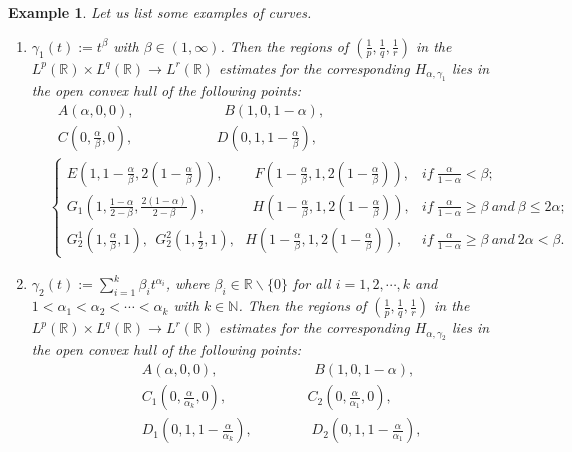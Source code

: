 \documentclass[11pt, twoside, leqno]{article}
\newtheorem{example}[theorem]{Example}
\theoremstyle{definition}
\numberwithin{equation}{section}
\begin{document}
\begin{example}
Let us list some examples of curves.
\begin{enumerate}
\item[\rm(1)] $\gamma_1(t):=t^\beta$ with $\beta\in(1,\infty)$. Then the regions of $(\frac{1}{p}, \frac{1}{q}, \frac{1}{r})$ in the $L^p(\mathbb{R})\times L^q(\mathbb{R}) \rightarrow L^r(\mathbb{R})$ estimates for the corresponding $H_{\alpha,\gamma_1}$ lies in the open convex hull of the following points:
\begin{align*}
&~~~A\left(\alpha,0,0\right),~~~~~~~~~~~~~~~~~~~~~~~~~~~~~B\left(1,0,1-\alpha\right),\\
&~~~C\left(0,\frac{\alpha}{\beta},0\right),~~~~~~~~~~~~~~~~~~~~~~~~~~~D\left(0,1,1-\frac{\alpha}{\beta}\right),\\
&\begin{cases}
 E\left(1, 1-\frac{\alpha}{\beta}, 2(1-\frac{\alpha}{\beta})\right),~~~~~~~~~~F\left(1-\frac{\alpha}{\beta}, 1, 2(1-\frac{\alpha}{\beta})\right),&  if~ \frac{\alpha}{1-\alpha}<\beta;\\
 G_1\left(1, \frac{1-\alpha}{2-\beta}, \frac{2(1-\alpha)}{2-\beta}\right),~~~~~~~~~~~~~~~H\left(1-\frac{\alpha}{\beta}, 1, 2(1-\frac{\alpha}{\beta})\right),& if~ \frac{\alpha}{1-\alpha} \geq \beta~and~\beta \leq 2\alpha;\\
G^1_2\left(1, \frac{\alpha}{\beta}, 1\right),~~G^2_2\left(1, \frac{1}{2}, 1\right),~~~H\left(1-\frac{\alpha}{\beta}, 1, 2(1-\frac{\alpha}{\beta})\right),& if~ \frac{\alpha}{1-\alpha} \geq \beta ~and~2\alpha<\beta.
\end{cases}
\end{align*}
\item[\rm(2)] $\gamma_2(t):=\sum\limits_{i=1}^{k} \beta_i t^{\alpha_i}$, where $\beta_i\in \mathbb{R}\backslash\{0\} $ for all $i=1,2,\cdots,k$ and $1<\alpha_1<\alpha_2<\cdots<\alpha_k$ with $k\in \mathbb{N}$. Then the regions of $(\frac{1}{p}, \frac{1}{q}, \frac{1}{r})$ in the $L^p(\mathbb{R})\times L^q(\mathbb{R}) \rightarrow L^r(\mathbb{R})$ estimates for the corresponding $H_{\alpha,\gamma_2}$ lies in the open convex hull of the following points:
 \begin{align*}
&~~~A\left(\alpha,0,0\right),~~~~~~~~~~~~~~~~~~~~~~~~~~~~~~~B\left(1,0,1-\alpha\right),\\
&~~~C_1\left(0,\frac{\alpha}{\alpha_k},0\right),~~~~~~~~~~~~~~~~~~~~~~~~~~C_2\left(0,\frac{\alpha}{\alpha_1},0\right),\\
&~~~D_1\left(0,1,1-\frac{\alpha}{\alpha_k}\right),~~~~~~~~~~~~~~~~~~~D_2\left(0,1,1-\frac{\alpha}{\alpha_1}\right),\\

\end{align*}
\end{enumerate}
\end{example}
\end{document}
